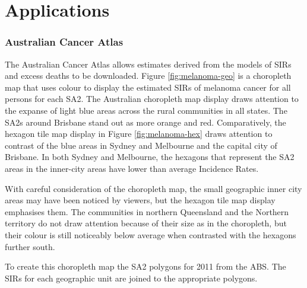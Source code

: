 \documentclass{monashthesis}
\begin{document}
\hypertarget{applications}{%
\section{Applications}\label{applications}}

\hypertarget{australian-cancer-atlas}{%
\subsubsection{Australian Cancer Atlas}\label{australian-cancer-atlas}}

The Australian Cancer Atlas \autocite{TACA} allows estimates derived from the models of SIRs and excess deaths to be downloaded.
Figure \ref{fig:melanoma-geo} is a choropleth map that uses colour to display the estimated SIRs of melanoma cancer for all persons for each SA2. The Australian choropleth map display draws attention to the expanse of light blue areas across the rural communities in all states. The SA2s around Brisbane stand out as more orange and red.
Comparatively, the hexagon tile map display in Figure \ref{fig:melanoma-hex} draws attention to contrast of the blue areas in Sydney and Melbourne and the capital city of Brisbane. In both Sydney and Melbourne, the hexagons that represent the SA2 areas in the inner-city areas have lower than average Incidence Rates.

With careful consideration of the choropleth map, the small geographic inner city areas may have been noticed by viewers, but the hexagon tile map display emphasises them. The communities in northern Queensland and the Northern territory do not draw attention because of their size as in the choropleth, but their colour is still noticeably below average when contrasted with the hexagons further south.

To create this choropleth map the SA2 polygons for 2011 from the ABS. The SIRs for each geographic unit are joined to the appropriate polygons.
\end{document}
